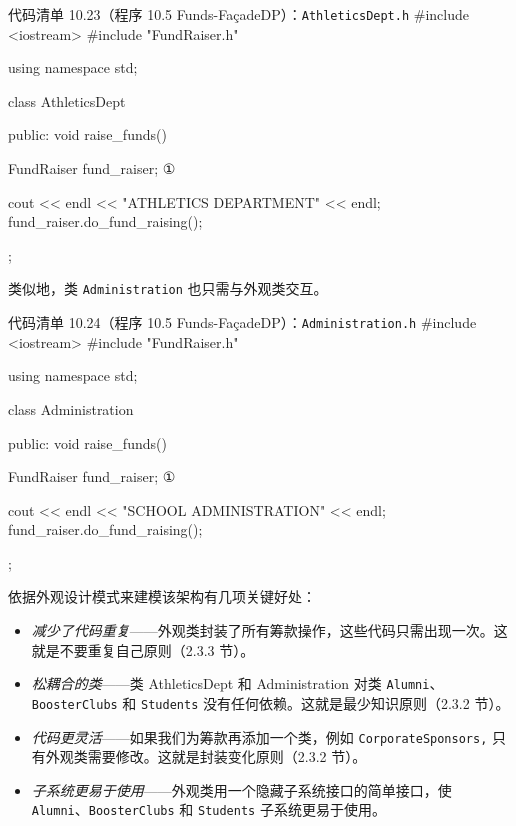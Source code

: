 \begin{codeboxt}{代码清单 10.23（程序 10.5 Funds-FaçadeDP）：\texttt{Athletics\allowbreak{}Dept.\allowbreak{}h}}
#include <iostream>
#include "FundRaiser.h"

using namespace std;

class AthleticsDept
{
public:
    void raise_funds()
    {
        FundRaiser fund_raiser;    ①

        cout << endl << "ATHLETICS DEPARTMENT" << endl;
        fund_raiser.do_fund_raising();
    }
};
\end{codeboxt}
\par

类似地，类 \texttt{Administration} 也只需与外观类交互。

\begin{codeboxt}{代码清单 10.24（程序 10.5 Funds-FaçadeDP）：\texttt{Administration.\allowbreak{}h}}
#include <iostream>
#include "FundRaiser.h"

using namespace std;

class Administration
{
public:
    void raise_funds()
    {
        FundRaiser fund_raiser;        ①

        cout << endl << "SCHOOL ADMINISTRATION" << endl;
        fund_raiser.do_fund_raising();
    }
};
\end{codeboxt}
\par


依据外观设计模式来建模该架构有几项关键好处：

\begin{itemize}
\item \emph{减少了代码重复}——外观类封装了所有筹款操作，这些代码只需出现一次。这就是不要重复自己原则（2.3.3 节）。
\item \emph{松耦合的类}——类 AthleticsDept 和 Administration 对类 \texttt{Alumni}、\texttt{Booster\allowbreak{}Clubs} 和 \texttt{Students} 没有任何依赖。这就是最少知识原则（2.3.2 节）。
\item \emph{代码更灵活}——如果我们为筹款再添加一个类，例如 \texttt{Corporate\allowbreak{}Sponsors,\allowbreak{}} 只有外观类需要修改。这就是封装变化原则（2.3.2 节）。
\item \emph{子系统更易于使用}——外观类用一个隐藏子系统接口的简单接口，使 \texttt{Alumni}、\texttt{Booster\allowbreak{}Clubs} 和 \texttt{Students} 子系统更易于使用。
\end{itemize}

